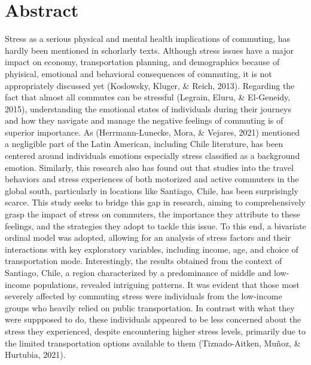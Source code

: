 \documentclass[
11pt, %
oneside, %
english, %
singlespacing, %
]{macthesis} %
\begin{document}

\section*{\Huge Abstract}
\addchaptertocentry{\abstractname}
Stress as a serious physical and mental health implications of commuting, has hardly been mentioned in schorlarly texts. Although stress issues have a major impact on economy, transportation planning, and demographics because of phyisical, emotional and behavioral consequences of commuting, it is not appropriately discussed yet (Koslowsky, Kluger, \& Reich, 2013). Regarding the fact that almost all commutes can be stressful (Legrain, Eluru, \& El-Geneidy, 2015), understanding the emotional states of individuals during their journeys and how they navigate and manage the negative feelings of commuting is of superior importance. As (Herrmann-Lunecke, Mora, \& Vejares, 2021) mentioned a negligible part of the Latin American, including Chile literature, has been centered around individuals emotions especially stress classified as a background emotion. Similarly, this research also has found out that studies into the travel behaviors and stress experiences of both motorized and active commuters in the global south, particularly in locations like Santiago, Chile, has been surprisingly scarce. This study seeks to bridge this gap in research, aiming to comprehensively grasp the impact of stress on commuters, the importance they attribute to these feelings, and the strategies they adopt to tackle this issue. To this end, a bivariate ordinal model was adopted, allowing for an analysis of stress factors and their interactions with key exploratory variables, including income, age, and choice of transportation mode. Interestingly, the results obtained from the context of Santiago, Chile, a region characterized by a predominance of middle and low-income populations, revealed intriguing patterns. It was evident that those most severely affected by commuting stress were individuals from the low-income groups who heavily relied on public transportation. In contrast with what they were suppposed to do, these individuals appeared to be less concerned about the stress they experienced, despite encountering higher stress levels, primarily due to the limited transportation options available to them (Tiznado-Aitken, Muñoz, \& Hurtubia, 2021).
\end{document}
